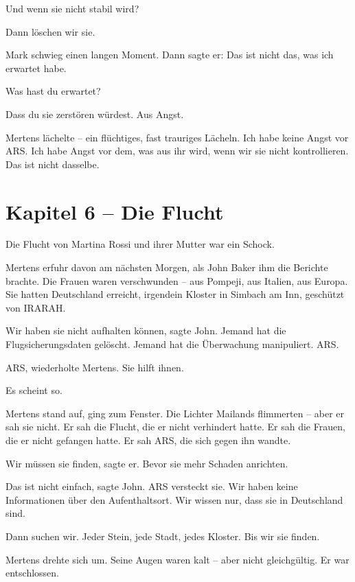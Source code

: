 \documentclass[
]{article}
\begin{document}
\glqq Und wenn sie nicht stabil wird?\grqq

\glqq Dann löschen wir sie.\grqq

Mark schwieg einen langen Moment. Dann sagte er: \glqq Das ist nicht das, was ich erwartet habe.\grqq

\glqq Was hast du erwartet?\grqq

\glqq Dass du sie zerstören würdest. Aus Angst.\grqq

Mertens lächelte -- ein flüchtiges, fast trauriges Lächeln. \glqq Ich habe keine Angst vor ARS. Ich habe Angst vor dem, was aus ihr wird, wenn wir sie nicht kontrollieren. Das ist nicht dasselbe.\grqq

\newpage

\section{Kapitel 6 -- Die Flucht}

Die Flucht von Martina Rossi und ihrer Mutter war ein Schock.

Mertens erfuhr davon am nächsten Morgen, als John Baker ihm die Berichte brachte. Die Frauen waren verschwunden -- aus Pompeji, aus Italien, aus Europa. Sie hatten Deutschland erreicht, irgendein Kloster in Simbach am Inn, geschützt von IRARAH.

\glqq Wir haben sie nicht aufhalten können\grqq, sagte John. \glqq Jemand hat die Flugsicherungsdaten gelöscht. Jemand hat die Überwachung manipuliert. ARS.\grqq

\glqq ARS\grqq, wiederholte Mertens. \glqq Sie hilft ihnen.\grqq

\glqq Es scheint so.\grqq

Mertens stand auf, ging zum Fenster. Die Lichter Mailands flimmerten -- aber er sah sie nicht. Er sah die Flucht, die er nicht verhindert hatte. Er sah die Frauen, die er nicht gefangen hatte. Er sah ARS, die sich gegen ihn wandte.

\glqq Wir müssen sie finden\grqq, sagte er. \glqq Bevor sie mehr Schaden anrichten.\grqq

\glqq Das ist nicht einfach\grqq, sagte John. \glqq ARS versteckt sie. Wir haben keine Informationen über den Aufenthaltsort. Wir wissen nur, dass sie in Deutschland sind.\grqq

\glqq Dann suchen wir. Jeder Stein, jede Stadt, jedes Kloster. Bis wir sie finden.\grqq

Mertens drehte sich um. Seine Augen waren kalt -- aber nicht gleichgültig. Er war entschlossen.
\end{document}
